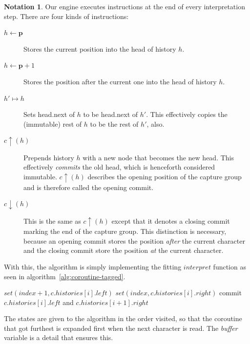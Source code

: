 \documentclass[11pt,a4paper,twoside,openright]{Thesis}
\theoremstyle{definition}
\newtheorem*{notation}{Notation}
\newcommand{\Secref}[1]{section~\ref{sec:#1}}
\newcommand{\pos}{\mathbf{\mathbf{p}}}
\begin{document}
\begin{notation}
Our engine executes instructions at the end of every interpretation
step. There are four kinds of instructions:

\begin{description}
\item [$h\leftarrow\pos$] Stores the current position into the head of history $h$.
\item [$h\leftarrow\pos+1$] Stores the position after the current one into the
  head of history $h$.
\item [$h'\mapsto h$] Sets head.next of $h$ to be head.next of $h'$.
	This effectively copies the (immutable) rest of $h$ to be the rest of $h'$, also.
\item [$c\uparrow(h)$] Prepends history $h$ with a new node that becomes the
  new head.  This effectively \emph{commits} the old head, which is henceforth
  considered immutable. $c\uparrow(h)$ describes the opening position of the
  capture group and is therefore called the opening commit.
\item [$c\downarrow(h)$] This is the same as $c\uparrow(h)$ except that it
  denotes a closing commit marking the end of the capture group.  This
  distinction is necessary, because an opening commit stores the position
  \emph{after} the current character and the closing commit store the
  position \emph{at} the current character.
\end{description}
\end{notation}

With this, the algorithm is simply implementing the fitting $interpret$
function as seen in algorithm~\ref{alg:coroutine-tagged}.

\begin{algorithm*}[htbp]
\begin{algorithmic}[1]
      \State $set(index+1, c.histories[i].left)$ \Comment{See \Secref{data-structures}}
    \EndIf
      \State $set(index, c.histories[i].right)$
      \State commit $c.histories[i].left$ and $c.histories[i+1].right$
    \EndIf
  \EndFunction
\end{algorithmic}
\label{alg:interpret}
\end{algorithm*}

The states are given to the algorithm in the order visited, so that the
coroutine that got furthest is expanded first when the next character is
read. The \emph{buffer} variable is a detail that ensures this.
\end{document}
